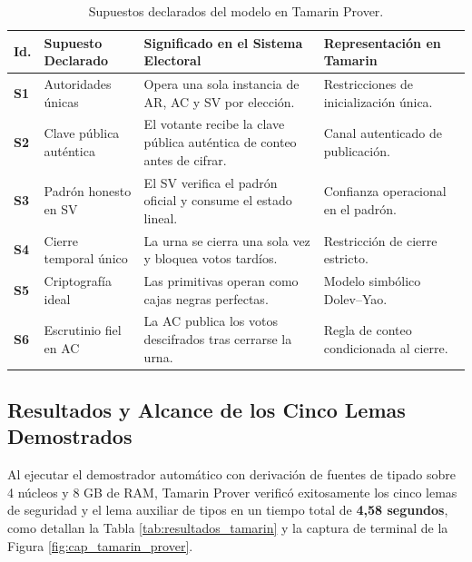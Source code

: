 \begin{table}[!htbp]
	\centering
	\footnotesize
	\begin{tabularx}{\textwidth}{p{0.6cm}p{2.9cm}X>{\raggedright\arraybackslash}p{4.0cm}}
		\toprule
		\textbf{Id.} & \textbf{Supuesto Declarado} & \textbf{Significado en el Sistema Electoral} & \textbf{Representación en Tamarin} \\
		\midrule
		\textbf{S1} & Autoridades únicas & Opera una sola instancia de AR, AC y SV por elección. & Restricciones de inicialización única. \\
		\textbf{S2} & Clave pública auténtica & El votante recibe la clave pública auténtica de conteo antes de cifrar. & Canal autenticado de publicación. \\
		\textbf{S3} & Padrón honesto en SV & El SV verifica el padrón oficial y consume el estado lineal. & Confianza operacional en el padrón. \\
		\textbf{S4} & Cierre temporal único & La urna se cierra una sola vez y bloquea votos tardíos. & Restricción de cierre estricto. \\
		\textbf{S5} & Criptografía ideal & Las primitivas operan como cajas negras perfectas. & Modelo simbólico Dolev--Yao. \\
		\textbf{S6} & Escrutinio fiel en AC & La AC publica los votos descifrados tras cerrarse la urna. & Regla de conteo condicionada al cierre. \\
		\bottomrule
	\end{tabularx}
	\caption{Supuestos declarados del modelo en Tamarin Prover.}
	\label{tab:supuestos_modelo_tamarin}
	\par{}
\end{table}

\subsection{Resultados y Alcance de los Cinco Lemas Demostrados}
\label{subsec:tamarin_resultados}
\label{subsec:tamarin_alcance_lemas}
\label{subsec:tamarin_limites}

Al ejecutar el demostrador automático con derivación de fuentes de tipado sobre 4 núcleos y 8 GB de RAM, Tamarin Prover verificó exitosamente los cinco lemas de seguridad y el lema auxiliar de tipos en un tiempo total de \textbf{4,58 segundos}, como detallan la Tabla \ref{tab:resultados_tamarin} y la captura de terminal de la Figura \ref{fig:cap_tamarin_prover}.

